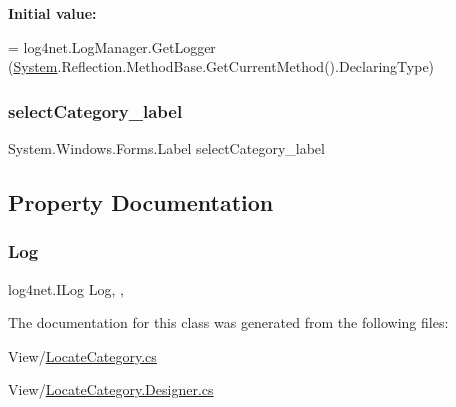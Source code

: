 {\bfseries Initial value\+:}
\begin{DoxyCode}
= log4net.LogManager.GetLogger
        (\hyperlink{namespaceSystem}{System}.Reflection.MethodBase.GetCurrentMethod().DeclaringType)
\end{DoxyCode}
\mbox{\label{classWildlifeTrackingApp_1_1LocateCategory_a2fd4190abaec4ee146747d5a024d1bda}} 
\subsubsection{\texorpdfstring{select\+Category\+\_\+label}{selectCategory\_label}}
{\footnotesize\ttfamily System.\+Windows.\+Forms.\+Label select\+Category\+\_\+label\hspace{0.3cm}{\ttfamily [private]}}



\subsection{Property Documentation}
\mbox{\label{classWildlifeTrackingApp_1_1LocateCategory_a5fc9abb86e6110ecd61d0a1a7d740a8a}} 
\subsubsection{\texorpdfstring{Log}{Log}}
{\footnotesize\ttfamily log4net.\+I\+Log Log\hspace{0.3cm}{\ttfamily [static]}, {\ttfamily [get]}, {}}



The documentation for this class was generated from the following files\+:\begin{DoxyCompactItemize}
\item 
View/\hyperlink{LocateCategory_8cs}{Locate\+Category.\+cs}\item 
View/\hyperlink{LocateCategory_8Designer_8cs}{Locate\+Category.\+Designer.\+cs}\end{DoxyCompactItemize}
